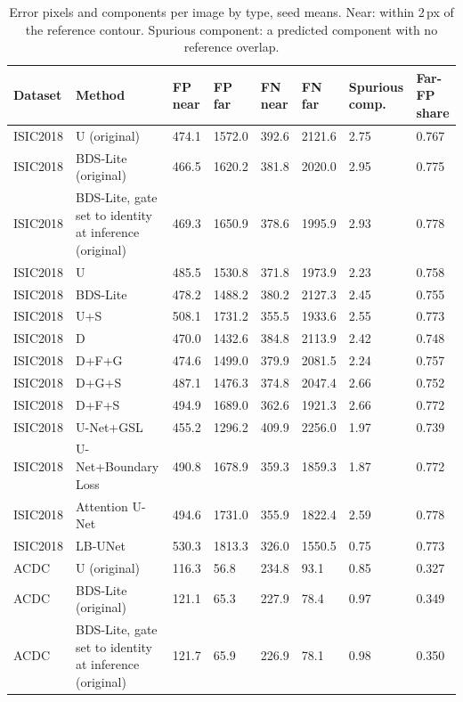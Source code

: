 \begin{longtable}{llllllll}
\caption{\label{tab:errorbands}Error pixels and components per image by type, seed means. Near: within 2\,px of the reference contour. Spurious component: a predicted component with no reference overlap.}\\
\toprule
Dataset & Method & FP near & FP far & FN near & FN far & Spurious comp. & Far-FP share \\
\midrule
ISIC2018 & U (original) & 474.1 & 1572.0 & 392.6 & 2121.6 & 2.75 & 0.767 \\
ISIC2018 & BDS-Lite (original) & 466.5 & 1620.2 & 381.8 & 2020.0 & 2.95 & 0.775 \\
ISIC2018 & BDS-Lite, gate set to identity at inference (original) & 469.3 & 1650.9 & 378.6 & 1995.9 & 2.93 & 0.778 \\
ISIC2018 & U & 485.5 & 1530.8 & 371.8 & 1973.9 & 2.23 & 0.758 \\
ISIC2018 & BDS-Lite & 478.2 & 1488.2 & 380.2 & 2127.3 & 2.45 & 0.755 \\
ISIC2018 & U+S & 508.1 & 1731.2 & 355.5 & 1933.6 & 2.55 & 0.773 \\
ISIC2018 & D & 470.0 & 1432.6 & 384.8 & 2113.9 & 2.42 & 0.748 \\
ISIC2018 & D+F+G & 474.6 & 1499.0 & 379.9 & 2081.5 & 2.24 & 0.757 \\
ISIC2018 & D+G+S & 487.1 & 1476.3 & 374.8 & 2047.4 & 2.66 & 0.752 \\
ISIC2018 & D+F+S & 494.9 & 1689.0 & 362.6 & 1921.3 & 2.66 & 0.772 \\
ISIC2018 & U-Net+GSL & 455.2 & 1296.2 & 409.9 & 2256.0 & 1.97 & 0.739 \\
ISIC2018 & U-Net+Boundary Loss & 490.8 & 1678.9 & 359.3 & 1859.3 & 1.87 & 0.772 \\
ISIC2018 & Attention U-Net & 494.6 & 1731.0 & 355.9 & 1822.4 & 2.59 & 0.778 \\
ISIC2018 & LB-UNet & 530.3 & 1813.3 & 326.0 & 1550.5 & 0.75 & 0.773 \\
ACDC & U (original) & 116.3 & 56.8 & 234.8 & 93.1 & 0.85 & 0.327 \\
ACDC & BDS-Lite (original) & 121.1 & 65.3 & 227.9 & 78.4 & 0.97 & 0.349 \\
ACDC & BDS-Lite, gate set to identity at inference (original) & 121.7 & 65.9 & 226.9 & 78.1 & 0.98 & 0.350 \\

\end{longtable}
